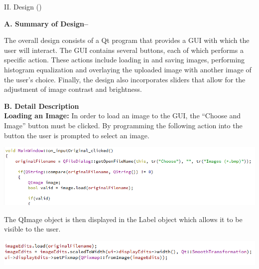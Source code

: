 \documentclass{article}
\newenvironment{Figure}
  {\par\medskip\noindent\ignorespaces\minipage{\linewidth}}
  {\endminipage\par\medskip}
\begin{document}
\begin{multicols*}{2}

\begin{center}
{\large II. Design ()}
\end{center}

{\bf A. Summary of Design--}  

The overall design consists of a Qt program that provides a GUI with which the user will interact. The GUI contains several buttons, each of which performs a specific action. These actions include loading in and saving images, performing histogram equalization and overlaying the uploaded image with another image of the user’s choice. Finally, the design also incorporates sliders that allow for the adjustment of image contrast and brightness.

{\bf B. Detail Description}\\

{\bf Loading an Image:}  
In order to load an image to the GUI, the “Choose and Image” button must be clicked. By programming the following action into the button the user is prompted to select an image.


\begin{Figure}
 \centering
 \includegraphics[width=\linewidth]{inputimage.png}
\end{Figure}


The QImage object is then displayed in the Label object which allows it to be visible to the user.


\begin{Figure}
 \centering
 \includegraphics[width=\linewidth]{labelDisplay.png}
\end{Figure}




\end{multicols*}
\end{document}
